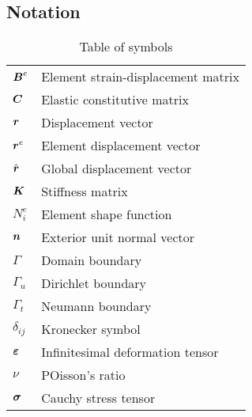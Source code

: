 \subsection{Notation}
\begin{table}[h!]
  \begin{center}
  \begin{tabular}{|l|p{8cm}|}
    \hline
    $\mbox{\boldmath$B$}^e$ & Element strain-displacement matrix\\
    $\mbox{\boldmath$C$}$ & Elastic constitutive matrix\\
    $\mbox{\boldmath$r$}$ & Displacement vector\\
    $\mbox{\boldmath$r$}^e$ & Element displacement vector\\
    $\hat{\mbox{\boldmath$r$}}$ & Global displacement vector\\
    $\mbox{\boldmath$K$}$ & Stiffness matrix\\
    $N_i^e$ & Element shape function\\
    $\mbox{\boldmath$n$}$ & Exterior unit normal vector\\
    $\Gamma$ & Domain boundary\\
    $\Gamma_u$ & Dirichlet boundary\\
    $\Gamma_t$ & Neumann boundary\\
    $\delta_{ij}$ & Kronecker symbol\\
    $\mbox{\boldmath$\varepsilon$}$ & Infinitesimal deformation tensor\\
    $\nu$ & POisson's ratio\\
    $\mbox{\boldmath$\sigma$}$ &Cauchy stress tensor\\
    \hline
  \end{tabular}
  \end{center}
  \caption{Table of symbols}
\end{table}
